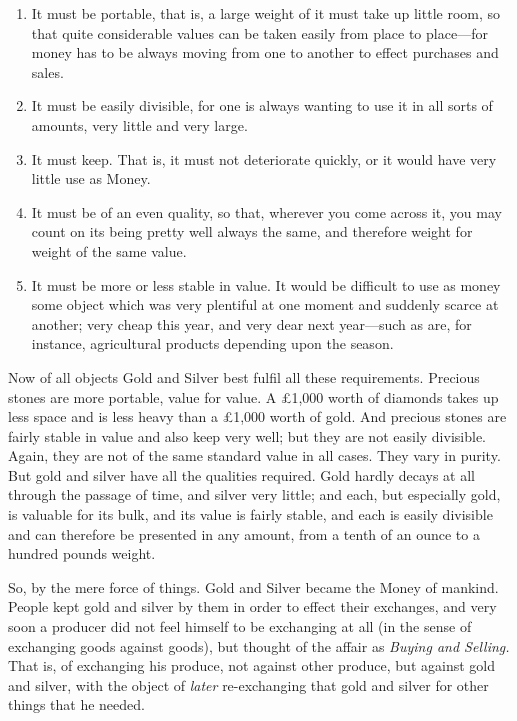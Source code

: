 \documentclass{book}
\begin{document}
\begin{enumerate}
	\item It must be portable, that is, a large weight of it must take up little room, so that quite considerable values can be taken easily from place to place—for money has to be always moving from one to another to effect purchases and sales.


	\item It must be easily divisible, for one is always wanting to use it in all sorts of amounts, very little and very large.


	\item It must keep. That is, it must not deteriorate quickly, or it would have very little use as Money.


	\item It must be of an even quality, so that, wherever you come across it, you may count on its being pretty well always the same, and therefore weight for weight of the same value.


	\item It must be more or less stable in value. It would be difficult to use as money some object which was very plentiful at one moment and suddenly scarce at another; very cheap this year, and very dear next year—such as are, for instance, agricultural products depending upon the season.



\end{enumerate}
Now of all objects Gold and Silver best fulfil all these requirements. Precious stones are more portable, value for value. A £1,000 worth of diamonds takes up less space and is less heavy than a £1,000 worth of gold. And precious stones are fairly stable in value and also keep very well; but they are not easily divisible. Again, they are not of the same standard value in all cases. They vary in purity. But gold and silver have all the qualities required. Gold hardly decays at all through the passage of time, and silver very little; and each, but especially gold, is valuable for its bulk, and its value is fairly stable, and each is easily divisible and can therefore be presented in any amount, from a tenth of an ounce to a hundred pounds weight.

So, by the mere force of things. Gold and Silver became the Money of mankind. People kept gold and silver by them in order to effect their exchanges, and very soon a producer did not feel himself to be exchanging at all (in the sense of exchanging goods against goods), but thought of the affair as \emph{Buying and Selling.} That is, of exchanging his produce, not against other produce, but against gold and silver, with the object of \emph{later} re-exchanging that gold and silver for other things that he needed.
\end{document}
